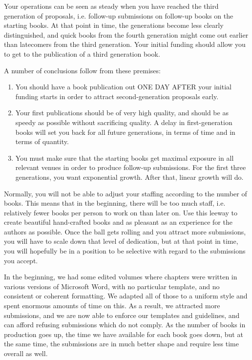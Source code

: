 \documentclass[guidelines,nonflat,modfonts] {langsci/langscibook}
\begin{document}
Your operations can be seen as steady when you have reached the third generation of proposals, i.e. follow-up submissions on follow-up books on the starting books. At that point in time, the generations become less clearly distinguished, and quick books from the fourth generation might come out earlier than latecomers from the third generation. Your initial funding should allow you to get to the publication of a third generation book.

A number of conclusions follow from these premises:

\begin{enumerate}
 \item You should have a book publication out ONE DAY AFTER your initial funding starts in order to attract second-generation proposals early. 
 \item Your first publications should be of very high quality, and should be as speedy as possible without sacrificing quality. A delay in first-generation books will set you back for all future generations, in terms of time and in terms of quantity.
 \item You must make sure that the starting books get maximal exposure in all relevant venues in order to produce follow-up submissions. For the first three generations, you want exponential growth. After that, linear growth will do. 
\end{enumerate}

Normally, you will not be able to adjust your staffing according to the number of books. This means that in the beginning, there will be too much staff, i.e. relatively fewer books per person to work on than later on. Use this leeway to create beautiful hand-crafted books and as pleasant as an experience for the authors as possible. Once the ball gets rolling and you attract more submissions, you will have to scale down that level of dedication, but at that point in time, you will hopefully be in a position to be selective with regard to the submissions you accept. 

In the beginning, we had some edited volumes where chapters were written in various versions of Microsoft Word, with no particular template, and no consistent or coherent formatting. We adapted all of those to a uniform style and spent enormous amounts of time on this. As a result, we attracted more submissions, and we are now able to enforce our templates and guidelines, and can afford refusing submissions which do not comply. As the number of books in production goes up, the time we have available for each book goes down, but at the same time, the submissions are in much better shape and require less time overall as well. 
\end{document}

